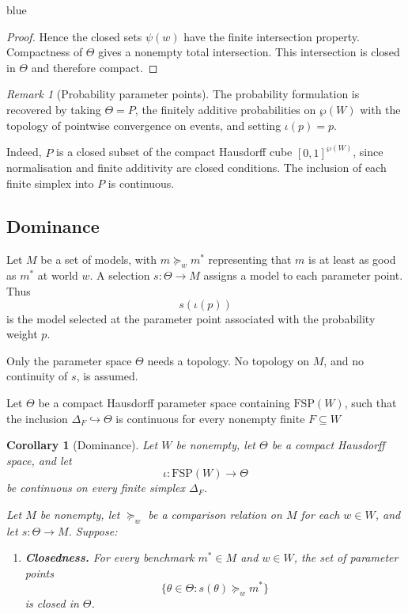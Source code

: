 \documentclass[11pt]{article}
\newtheorem{corollary}[theorem]{Corollary}
\theoremstyle{definition}
\theoremstyle{remark}
\newtheorem{remark}[theorem]{Remark}
\newenvironment{AIwritten}{\begin{color}{blue}}{\end{color}}
\begin{document}
\begin{AIwritten}
\begin{proof}
	Hence the closed sets $\psi(w)$ have the finite
	intersection property. Compactness of $\Theta$ gives
	a nonempty total intersection. This intersection
	is closed in $\Theta$ and therefore compact.
\end{proof}

\begin{remark}[Probability parameter points]
	The probability formulation is recovered by taking
	$\Theta=P$, the finitely additive probabilities on
	$\wp(W)$ with the topology of pointwise convergence
	on events, and setting $\iota(p)=p$.
	
	Indeed, $P$ is a closed subset of the compact
	Hausdorff cube $[0,1]^{\wp(W)}$, since normalisation
	and finite additivity are closed conditions.
	The inclusion of each finite simplex into $P$
	is continuous.
\end{remark}

\subsection{Dominance}

Let $M$ be a set of models, with $m\succeq_w m^*$
representing that $m$ is at least as good as $m^*$
at world $w$.
A selection $s:\Theta\to M$ assigns a model to each
parameter point. Thus
\[
s(\iota(p))
\]
is the model selected at the parameter point
associated with the probability weight $p$.

Only the parameter space $\Theta$ needs a topology.
No topology on $M$, and no continuity of $s$,
is assumed.


Let $\Theta$ be a compact Hausdorff parameter space
containing $\mathrm{FSP}(W)$, such that the inclusion
$\Delta_F\hookrightarrow\Theta$ is continuous for
every nonempty finite $F\subseteq W$


\begin{corollary}[Dominance]\label{thm:dom}
	Let $W$ be nonempty, let $\Theta$ be a compact Hausdorff
	space, and let
	\[
	\iota:\mathrm{FSP}(W)\to \Theta
	\]
	be continuous on every finite simplex $\Delta_F$.
	
	Let $M$ be nonempty, let $\succeq_w$ be a comparison
	relation on $M$ for each $w\in W$, and let
	$s:\Theta\to M$.
	Suppose:
	\begin{enumerate}
		\item\label{ass:cl} \textbf{Closedness.}
		For every benchmark $m^*\in M$ and $w\in W$,
		the set of parameter points
		\[
		\{\theta\in \Theta:s(\theta)\succeq_w m^*\}
		\]
		is closed in $\Theta$.
		

\end{enumerate}
\end{corollary}
\end{AIwritten}
\end{document}
